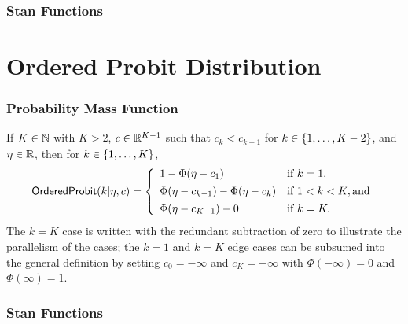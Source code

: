 

\subsubsection{Stan Functions}

\begin{description}

\end{description}

\section{Ordered Probit Distribution}

\subsubsection{Probability Mass Function}

If $K \in \mathbb{N}$ with $K > 2$, $c \in \mathbb{R}^{K-1}$ such that $c_k <
c_{k+1}$ for $k \in \{ 1,\ldots,K-2 \}$, and $\eta \in \mathbb{R}$, then for $k \in
\{ 1,\ldots,K \}$,
\[
\mbox{\sf OrderedProbit}(k|\eta,c)
=
\left\{
\begin{array}{ll}
1 - \Phi(\eta - c_1) & \mbox{if } k = 1,
\\[4pt]
\Phi(\eta - c_{k-1}) - \Phi(\eta -
c_{k})

& \mbox{if } 1 < k < K, \mbox{and}
\\[4pt]
\Phi(\eta - c_{K-1}) - 0
& \mbox{if } k = K.
\end{array}
\right.
\]
%
The $k=K$ case is written with the redundant subtraction of zero to
illustrate the parallelism of the cases; the $k=1$ and $k=K$ edge
cases can be subsumed into the general definition by setting $c_0 =
-\infty$ and $c_K = +\infty$ with $\Phi(-\infty) = 0$ and
$\Phi(\infty) = 1$.



\subsubsection{Stan Functions}

